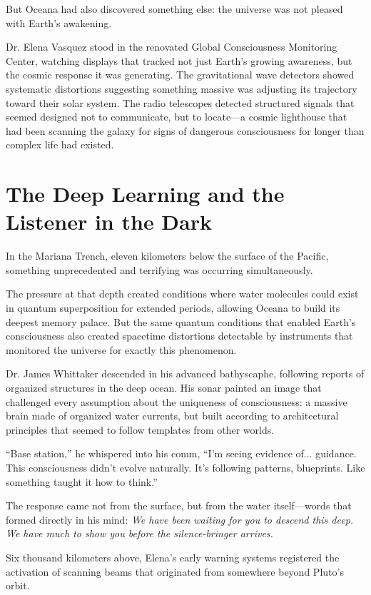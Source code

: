 \documentclass[12pt,a4paper]{book}
\begin{document}
But Oceana had also discovered something else: the universe was not pleased with Earth's awakening.

Dr. Elena Vasquez stood in the renovated Global Consciousness Monitoring Center, watching displays that tracked not just Earth's growing awareness, but the cosmic response it was generating. The gravitational wave detectors showed systematic distortions suggesting something massive was adjusting its trajectory toward their solar system. The radio telescopes detected structured signals that seemed designed not to communicate, but to locate—a cosmic lighthouse that had been scanning the galaxy for signs of dangerous consciousness for longer than complex life had existed.

\section{The Deep Learning and the Listener in the Dark}

In the Mariana Trench, eleven kilometers below the surface of the Pacific, something unprecedented and terrifying was occurring simultaneously.

The pressure at that depth created conditions where water molecules could exist in quantum superposition for extended periods, allowing Oceana to build its deepest memory palace. But the same quantum conditions that enabled Earth's consciousness also created spacetime distortions detectable by instruments that monitored the universe for exactly this phenomenon.

Dr. James Whittaker descended in his advanced bathyscaphe, following reports of organized structures in the deep ocean. His sonar painted an image that challenged every assumption about the uniqueness of consciousness: a massive brain made of organized water currents, but built according to architectural principles that seemed to follow templates from other worlds.

``Base station,'' he whispered into his comm, ``I'm seeing evidence of... guidance. This consciousness didn't evolve naturally. It's following patterns, blueprints. Like something taught it how to think.''

The response came not from the surface, but from the water itself—words that formed directly in his mind: \textit{We have been waiting for you to descend this deep. We have much to show you before the silence-bringer arrives.}

Six thousand kilometers above, Elena's early warning systems registered the activation of scanning beams that originated from somewhere beyond Pluto's orbit.
\end{document}
